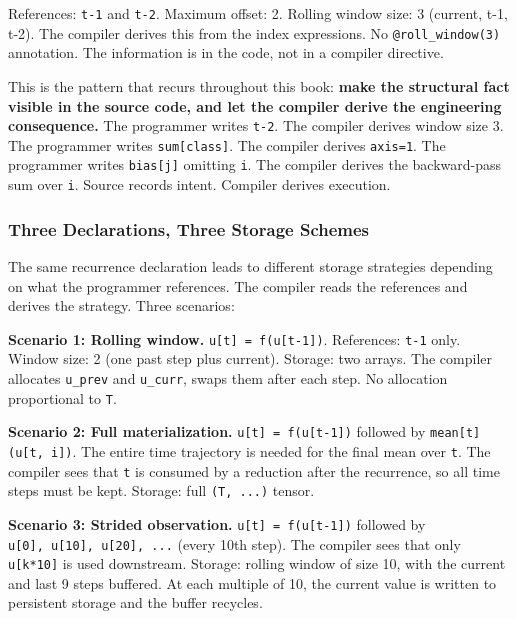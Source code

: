 \documentclass[11pt,titlepage]{article}
\begin{document}
References: \texttt{t-1} and \texttt{t-2}. Maximum offset: 2. Rolling
window size: 3 (current, t-1, t-2). The compiler derives this from the
index expressions. No \texttt{@roll\_window(3)} annotation. The
information is in the code, not in a compiler directive.

This is the pattern that recurs throughout this book: \textbf{make the
structural fact visible in the source code, and let the compiler derive
the engineering consequence.} The programmer writes \texttt{t-2}. The
compiler derives window size 3. The programmer writes
\texttt{sum{[}class{]}}. The compiler derives \texttt{axis=1}. The
programmer writes \texttt{bias{[}j{]}} omitting \texttt{i}. The compiler
derives the backward-pass sum over \texttt{i}. Source records intent.
Compiler derives execution.

\vspace{2em}

\hypertarget{three-declarations-three-storage-schemes}{%
\subsubsection{Three Declarations, Three Storage
Schemes}\label{three-declarations-three-storage-schemes}}

The same recurrence declaration leads to different storage strategies
depending on what the programmer references. The compiler reads the
references and derives the strategy. Three scenarios:

\textbf{Scenario 1: Rolling window.}
\texttt{u{[}t{]}\ =\ f(u{[}t-1{]})}. References: \texttt{t-1} only.
Window size: 2 (one past step plus current). Storage: two arrays. The
compiler allocates \texttt{u\_prev} and \texttt{u\_curr}, swaps them
after each step. No allocation proportional to \texttt{T}.

\textbf{Scenario 2: Full materialization.}
\texttt{u{[}t{]}\ =\ f(u{[}t-1{]})} followed by
\texttt{mean{[}t{]}(u{[}t,\ i{]})}. The entire time trajectory is needed
for the final mean over \texttt{t}. The compiler sees that \texttt{t} is
consumed by a reduction after the recurrence, so all time steps must be
kept. Storage: full \texttt{(T,\ ...)} tensor.

\textbf{Scenario 3: Strided observation.}
\texttt{u{[}t{]}\ =\ f(u{[}t-1{]})} followed by
\texttt{u{[}0{]},\ u{[}10{]},\ u{[}20{]},\ ...} (every 10th step). The
compiler sees that only \texttt{u{[}k*10{]}} is used downstream.
Storage: rolling window of size 10, with the current and last 9 steps
buffered. At each multiple of 10, the current value is written to
persistent storage and the buffer recycles.
\end{document}
